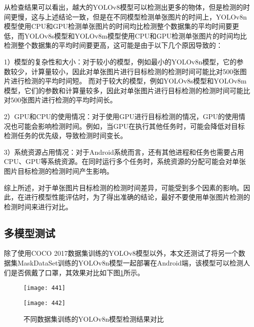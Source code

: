 \documentclass{ctexart}
\numberwithin{equation}{section}%
\numberwithin{figure}{section}%
\numberwithin{table}{section}%
\begin{document}
	从检查结果可以看出，越大的YOLOv8模型可以检测出更多的物体，但是检测的时间更慢，这与上述结论一致，但是在不同模型检测单张图片的时间上，YOLOv8n模型使用CPU和GPU检测单张图片的时间均比检测整个数据集的平均时间要更低，而YOLOv8s模型和YOLOv8m模型使用CPU和GPU检测单张图片的时间均比检测整个数据集的平均时间要更高，这可能是由于以下几个原因导致的：
	
	1）模型的复杂性和大小：对于较小的模型，例如最小的YOLOv8n模型，它的参数较少，计算量较小，因此对单张图片进行目标检测的检测时间可能比对500张图片进行检测的平均时间短。%
	而对于较大的模型，例如YOLOv8s模型和YOLOv8m模型，它们的参数和计算量较多，因此对单张图片进行目标检测的检测时间可能比对500张图片进行检测的平均时间长。%

	2）GPU和CPU的使用情况：对于使用GPU进行目标检测的情况，GPU的使用情况也可能会影响检测时间。例如，当GPU在执行其他任务时，可能会降低对目标检测任务的优先级，导致检测时间变长。%
	
	
	3）系统资源占用情况：对于Android系统而言，还有其他进程和任务也需要占用CPU、GPU等系统资源。在同时运行多个任务时，系统资源的分配可能会对单张图片目标检测的检测时间产生影响。
	
	综上所述，对于单张图片目标检测的检测时间差异，可能受到多个因素的影响。因此，在进行模型性能评估时，为了得出准确的结论，最好不要使用单张图片检测的检测时间来进行对比。
	
	\subsection{多模型测试}
	除了使用COCO 2017数据集训练的YOLOv8模型以外，本文还测试了将另一个数据集MaskDataSet训练的YOLOv8n模型一起部署在Android端，该模型可以检测人们是否佩戴了口罩，其效果对比如下图\ref{t441}所示。
	
	\begin{figure}[h]
		\centering
		\begin{minipage}{0.35\linewidth}
			\centering
			\texttt{[image: 441]}
		\end{minipage}
		\begin{minipage}{0.35\linewidth}
			\centering
			\texttt{[image: 442]}
		\end{minipage}
		\caption{不同数据集训练的YOLOv8n模型检测结果对比}
		\label{t441}%
	\end{figure}
\end{document}
